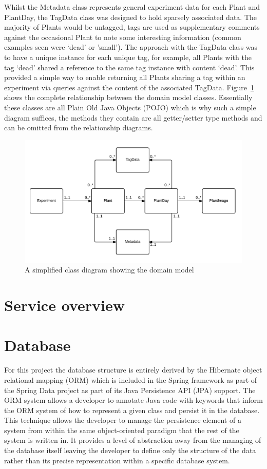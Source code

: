 Whilst the Metadata class represents general experiment data for each Plant and PlantDay, the TagData class was designed to hold sparsely associated data. The majority of Plants would be untagged, tags are used as supplementary comments against the occasional Plant to note some interesting information (common examples seen were `dead' or 'small'). The approach with the TagData class was to have a unique instance for each unique tag, for example, all Plants with the tag `dead' shared a reference to the same tag instance with content `dead'. This provided a simple way to enable returning all Plants sharing a tag within an experiment via queries against the content of the associated TagData. Figure~\ref{fig:domain2} shows the complete relationship between the domain model classes. Essentially these classes are all Plain Old Java Objects (POJO) which is why such a simple diagram suffices, the methods they contain are all getter/setter type methods and can be omitted from the relationship diagrams.


\begin{figure}[H]
    \centering
    \includegraphics[width=\textwidth]{images/design/domain2}
    \caption{A simplified class diagram showing the domain model}
    \label{fig:domain2}
\end{figure} 

\section{Service overview}

\section{Database} \label{db}

For this project the database structure is entirely derived by the Hibernate\cite{_hibernate} object relational mapping (ORM) which is included in the Spring framework as part of the Spring Data project as part of its Java Persistence API (JPA) support. The ORM system allows a developer to annotate Java code with keywords that inform the ORM system of how to represent a given class and persist it in the database. This technique allows the developer to manage the persistence element of a system from within the same object-oriented paradigm that the rest of the system is written in. It provides a level of abstraction away from the managing of the database itself leaving the developer to define only the structure of the data rather than its precise representation within a specific database system.


